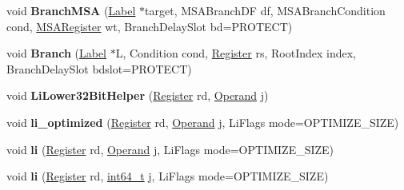 \begin{DoxyCompactItemize}
void {\bfseries Branch\+M\+SA} (\mbox{\hyperlink{classv8_1_1internal_1_1Label}{Label}} $\ast$target, M\+S\+A\+Branch\+DF df, M\+S\+A\+Branch\+Condition cond, \mbox{\hyperlink{classv8_1_1internal_1_1MSARegister}{M\+S\+A\+Register}} wt, Branch\+Delay\+Slot bd=P\+R\+O\+T\+E\+CT)
\item 
\mbox{\label{classv8_1_1internal_1_1TurboAssembler_a0bade19fba087b116b6483c64750d086}} 
void {\bfseries Branch} (\mbox{\hyperlink{classv8_1_1internal_1_1Label}{Label}} $\ast$L, Condition cond, \mbox{\hyperlink{classv8_1_1internal_1_1Register}{Register}} rs, Root\+Index index, Branch\+Delay\+Slot bdslot=P\+R\+O\+T\+E\+CT)
\item 
\mbox{\label{classv8_1_1internal_1_1TurboAssembler_ab206d3ff4195007f2b01d685e7a3160f}} 
void {\bfseries Li\+Lower32\+Bit\+Helper} (\mbox{\hyperlink{classv8_1_1internal_1_1Register}{Register}} rd, \mbox{\hyperlink{classv8_1_1internal_1_1Operand}{Operand}} j)
\item 
\mbox{\label{classv8_1_1internal_1_1TurboAssembler_aef4277b1c4290c687ea7d7b79fd560ed}} 
void {\bfseries li\+\_\+optimized} (\mbox{\hyperlink{classv8_1_1internal_1_1Register}{Register}} rd, \mbox{\hyperlink{classv8_1_1internal_1_1Operand}{Operand}} j, Li\+Flags mode=O\+P\+T\+I\+M\+I\+Z\+E\+\_\+\+S\+I\+ZE)
\item 
\mbox{\label{classv8_1_1internal_1_1TurboAssembler_a4e389bd49edcc474e41b7303438325e7}} 
void {\bfseries li} (\mbox{\hyperlink{classv8_1_1internal_1_1Register}{Register}} rd, \mbox{\hyperlink{classv8_1_1internal_1_1Operand}{Operand}} j, Li\+Flags mode=O\+P\+T\+I\+M\+I\+Z\+E\+\_\+\+S\+I\+ZE)
\item 
\mbox{\label{classv8_1_1internal_1_1TurboAssembler_ac875b2b03a0d10a3ebd800edabb4b53c}} 
void {\bfseries li} (\mbox{\hyperlink{classv8_1_1internal_1_1Register}{Register}} rd, \mbox{\hyperlink{classint64__t}{int64\+\_\+t}} j, Li\+Flags mode=O\+P\+T\+I\+M\+I\+Z\+E\+\_\+\+S\+I\+ZE)
\item 
\mbox{\label{classv8_1_1internal_1_1TurboAssembler_adef698dfe7f9e3d267588f0047b43ea4}} 

\end{DoxyCompactItemize}

